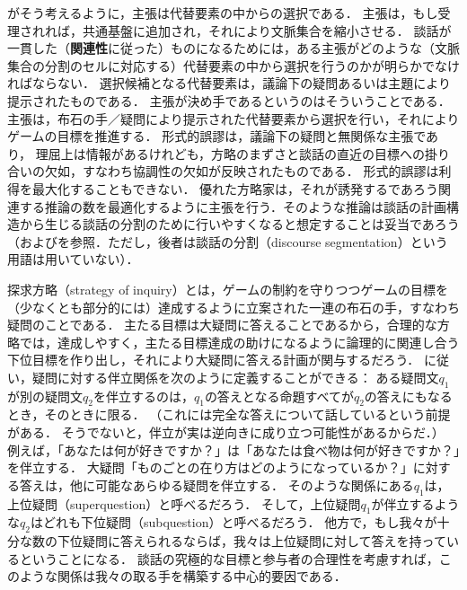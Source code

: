 \documentclass{goken}
\newcommand{\term}[2]{\textsf{#1}（#2）}
\newcommand{\ori}[1]{\noindent\textcolor[gray]{0.7}{\fontsize{8pt}{8pt}\selectfont{\textsf{(p.~#1)}}} }
\begin{document}
\citeauthor{Stalnaker1978}がそう考えるように，主張は代替要素の中からの選択である．
主張は，もし受理されれば，共通基盤に追加され，それにより文脈集合を縮小させる．
談話が一貫した（\textbf{関連性}に従った）ものになるためには，ある主張がどのような（文脈集合の分割のセルに対応する）代替要素の中から選択を行うのかが明らかでなければならない．
選択候補となる代替要素は，議論下の疑問あるいは主題により提示されたものである．
主張が決め手であるというのはそういうことである．
主張は，布石の手／疑問により提示された代替要素から選択を行い，それによりゲームの目標を推進する．
形式的誤謬は，議論下の疑問と無関係な主張であり，
理屈上は情報があるけれども，方略のまずさと談話の直近の目標への掛り合いの欠如，すなわち協調性の欠如が反映されたものである．
形式的誤謬は利得を最大化することもできない．
優れた方略家は，それが誘発するであろう関連する推論の数を最適化するように主張を行う．そのような推論は談話の計画構造から生じる談話の分割のために行いやすくなると想定することは妥当であろう（\citet{GroszSidner1986}および\citet{SperberWilson1986}を参照．ただし，後者は\term{談話の分割}{discourse segmentation}という用語は用いていない）．

\term{探求方略}{strategy of inquiry}とは，ゲームの制約を守りつつゲームの目標を（少なくとも部分的には）達成するように立案された一連の布石の手，すなわち疑問のことである．
主たる目標は大疑問に答えることであるから，合理的な方略では，達成しやすく，主たる目標達成の助けになるように論理的に関連し合う下位目標を作り出し，それにより大疑問に答える計画が関与するだろう．
\citet[16]{GroenendijkStokhof1984}に従い，疑問に対する伴立関係を次のように定義することができる：\ori{7}\textsf{ある疑問文$q_1$が別の疑問文$q_2$を伴立するのは，$q_1$の答えとなる命題すべてが$q_2$の答えにもなるとき，そのときに限る}．
（これには完全な答えについて話しているという前提がある．
そうでないと，伴立が実は逆向きに成り立つ可能性があるからだ．）
例えば，「あなたは何が好きですか？」は「あなたは食べ物は何が好きですか？」を伴立する．
大疑問「ものごとの在り方はどのようになっているか？」に対する答えは，他に可能なあらゆる疑問を伴立する．
そのような関係にある$q_1$は，\term{上位疑問}{superquestion}と呼べるだろう．
そして，上位疑問$q_1$が伴立するような$q_2$はどれも\term{下位疑問}{subquestion}と呼べるだろう．
他方で，もし我々が十分な数の下位疑問に答えられるならば，我々は上位疑問に対して答えを持っているということになる．
談話の究極的な目標と参与者の合理性を考慮すれば，このような関係は我々の取る手を構築する中心的要因である．
\end{document}
